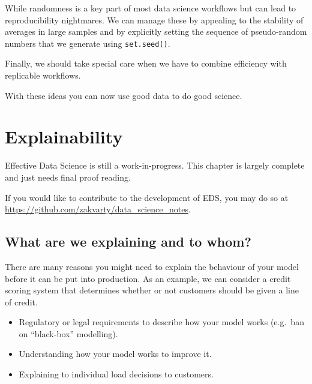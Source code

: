 \documentclass[
  letterpaper,
  DIV=11,
  numbers=noendperiod]{scrreprt}
\providecommand{\tightlist}{%
  \setlength{\itemsep}{0pt}\setlength{\parskip}{0pt}}\usepackage{longtable,booktabs,array}
\begin{document}
While randomness is a key part of most data science workflows but can
lead to reproducibility nightmares. We can manage these by appealing to
the stability of averages in large samples and by explicitly setting the
sequence of pseudo-random numbers that we generate using
\texttt{set.seed()}.

Finally, we should take special care when we have to combine efficiency
with replicable workflows.

With these ideas you can now use good data to do good science.

\chapter{Explainability}\label{production-explainability}

\begin{tcolorbox}[enhanced jigsaw, coltitle=black, opacityback=0, left=2mm, titlerule=0mm, breakable, colback=white, opacitybacktitle=0.6, colbacktitle=quarto-callout-note-color!10!white, bottomtitle=1mm, toptitle=1mm, colframe=quarto-callout-note-color-frame, bottomrule=.15mm, leftrule=.75mm, title=\textcolor{quarto-callout-note-color}{\faInfo}\hspace{0.5em}{Note}, toprule=.15mm, arc=.35mm, rightrule=.15mm]

Effective Data Science is still a work-in-progress. This chapter is
largely complete and just needs final proof reading.

If you would like to contribute to the development of EDS, you may do so
at \url{https://github.com/zakvarty/data_science_notes}.

\end{tcolorbox}

\section{What are we explaining and to
whom?}\label{what-are-we-explaining-and-to-whom}

There are many reasons you might need to explain the behaviour of your
model before it can be put into production. As an example, we can
consider a credit scoring system that determines whether or not
customers should be given a line of credit.

\begin{itemize}
\tightlist
\item
  Regulatory or legal requirements to describe how your model works
  (e.g.~ban on ``black-box'' modelling).
\item
  Understanding how your model works to improve it.
\item
  Explaining to individual load decisions to customers.
\end{itemize}
\end{document}
